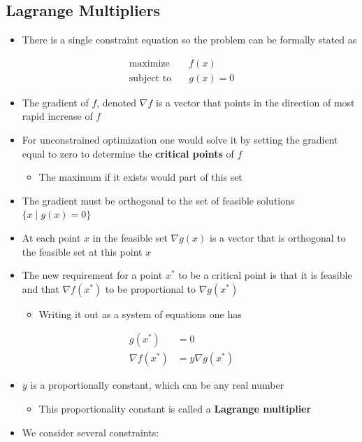 \documentclass[11pt]{article}
\begin{document}
\subsection{Lagrange Multipliers}
\label{sec:orgddb6cb7}
\begin{itemize}
\item There is a single constraint equation so the problem can be formally stated as
\end{itemize}
\begin{align*}
  \text{maximize} & \quad f(x) \\
  \text{subject to} & \quad g(x)=0
\end{align*}
\begin{itemize}
\item The gradient of \(f\), denoted \(\nabla f\) is a vector that points in the direction of most rapid increase of \(f\)
\item For unconstrained optimization one would solve it by setting the gradient equal to zero to determine the \textbf{critical points} of \(f\)
\begin{itemize}
\item The maximum if it exists would part of this set
\end{itemize}
\item The gradient must be orthogonal to the set of feasible solutions \(\{x \mid g(x)= 0\}\)
\item At each point \(x\) in the feasible set \(\nabla g(x)\) is a vector that is orthogonal to the feasible set at this point \(x\)
\item The new requirement for a point \(x^*\) to be a critical point is that it is feasible and that \(\nabla f(x^*)\) to be proportional to \(\nabla g(x^*)\)
\begin{itemize}
\item Writing it out as a system of equations one has
\end{itemize}
\end{itemize}
\begin{align*}
  g(x^*) &= 0 \\	
  \nabla f(x^*) &= y \nabla g(x^*)
\end{align*}
\begin{itemize}
\item \(y\) is a proportionally constant, which can be any real number
\begin{itemize}
\item This proportionality constant is called a \textbf{Lagrange multiplier}
\end{itemize}

\item We consider several constraints:
\end{itemize}
\end{document}
